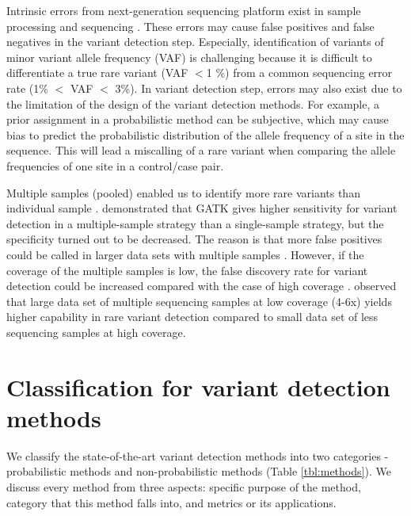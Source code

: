 \documentclass[11pt,reqno]{amsart}
\begin{document}
Intrinsic errors from next-generation sequencing platform exist in sample processing and sequencing \citep{Olson2015}.
These errors may cause false positives and false negatives in the variant detection step.
Especially, identification of variants of minor variant allele frequency (VAF) is challenging because it is difficult to differentiate a true rare variant (VAF $<$1 \%) from a common sequencing error rate (1\% $<$ VAF $<$ 3\%).
In variant detection step, errors may also exist due to the limitation of the design of the variant detection methods.
For example, a prior assignment in a probabilistic method can be subjective, which may cause bias to predict the probabilistic distribution of the allele frequency of a site in the sequence.
This will lead a miscalling of a rare variant when comparing the allele frequencies of one site in a control/case pair.

Multiple samples (pooled) enabled us to identify more rare variants than individual sample \citep{Bao2014, liu2012steps}.
\citep{liu2013variant} demonstrated that GATK gives higher sensitivity for variant detection in a multiple-sample strategy than a single-sample strategy, but the specificity turned out to be decreased.
The reason is that more false positives could be called in larger data sets with multiple samples \citep{Nielsen2011}.
However, if the coverage of the multiple samples is low, the false discovery rate for variant detection could be increased compared with the case of high coverage \citep{Cheng2014}.
\citep{le2011snp} observed that large data set of multiple sequencing samples at low coverage (4-6x) yields higher capability in rare variant detection compared to small data set of less sequencing samples at high coverage.

\section{Classification for variant detection methods}
We classify the state-of-the-art variant detection methods into two categories - probabilistic methods and non-probabilistic methods (Table \ref{tbl:methods}).
We discuss every method from three aspects: specific purpose of the method, category that this method falls into, and metrics or its applications.
\end{document}
